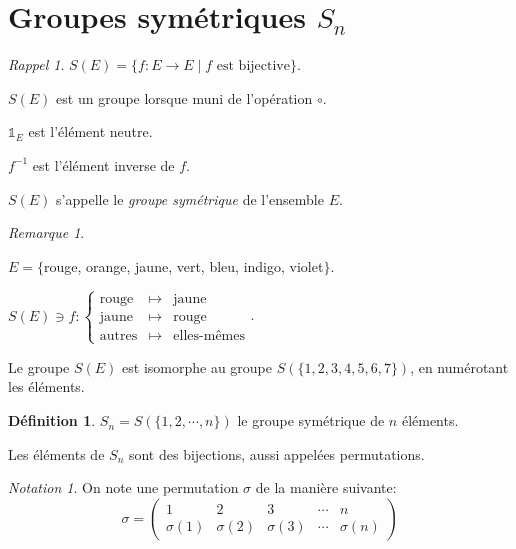 \documentclass{report}
\theoremstyle{definition}
\newtheorem*{defin}{D\'efinition}
\theoremstyle{remark}
\newtheorem*{nota}{Notation}
\newtheorem*{rema}{Remarque}
\newtheorem*{rappel}{Rappel}
\begin{document}
	\section{Groupes sym\'etriques $S_n$}
	\begin{rappel}
		$S(E) = \{f:E \to E \mid f \text{ est bijective}\}$.

		$S(E)$ est un groupe lorsque muni de l'op\'eration $\circ$.

		$\mathds{1}_E$ est l'\'el\'ement neutre.

		$f^{-1}$ est l'\'el\'ement inverse de $f$.

		$S(E)$ s'appelle le \emph{groupe sym\'etrique} de l'ensemble $E$.
	\end{rappel}
	\begin{rema}
		~

		$E = \{$rouge, orange, jaune, vert, bleu, indigo, violet$\}$.

		$S(E) \ni f:\left\lbrace \begin{array}{rcl}
			\text{rouge}&\mapsto&\text{jaune}\\
			\text{jaune}&\mapsto&\text{rouge}\\
			\text{autres}&\mapsto&\text{elles-m\^emes}
		\end{array} \right.$.

		Le groupe $S(E)$ est isomorphe au groupe $S(\{1,2,3,4,5,6,7\})$, en num\'erotant les \'el\'ements.
	\end{rema}
	\begin{defin}
		$S_n = S(\{1,2,\dotsb,n\})$ le groupe sym\'etrique de $n$ \'el\'ements.

		Les \'el\'ements de $S_n$ sont des bijections, aussi appel\'ees permutations.
	\end{defin}
	\begin{nota}
		On note une permutation $\sigma$ de la mani\`ere suivante:
		\[
		\sigma=\begin{pmatrix}
			1&2&3&\dotsb&n\\
			\sigma(1)&\sigma(2)&\sigma(3)&\dotsb&\sigma(n)
		\end{pmatrix}
		\]
	\end{nota}
\end{document}
